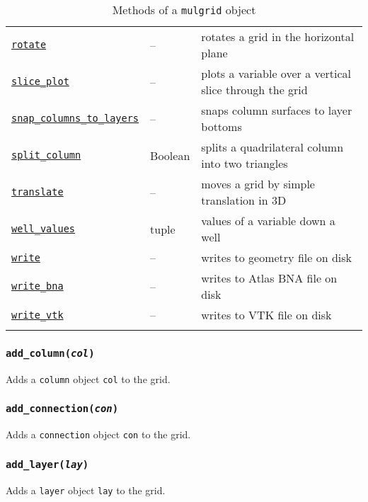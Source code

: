 \begin{center}
\begin{longtable}{|l|l|p{70mm}|}
  \hyperref[sec:rotate]{\texttt{rotate}} & -- & rotates a grid in the horizontal plane\\
  \hyperref[sec:slice_plot]{\texttt{slice\_plot}} & -- & plots a variable over a vertical slice through the grid\\
  \hyperref[sec:snap_columns_to_layers]{\texttt{snap\_columns\_to\_layers}} & -- & snaps column surfaces to layer bottoms\\
  \hyperref[sec:split_column]{\texttt{split\_column}} & Boolean & splits a quadrilateral column into two triangles\\ 
  \hyperref[sec:translate]{\texttt{translate}} & -- & moves a grid by simple translation in 3D\\
  \hyperref[sec:well_values]{\texttt{well\_values}} & tuple & values of a variable down a well\\
  \hyperref[sec:write]{\texttt{write}} & -- & writes to geometry file on disk\\
  \hyperref[sec:write_bna]{\texttt{write\_bna}} & -- & writes to Atlas BNA file on disk\\ 
  \hyperref[sec:write_vtk]{\texttt{write\_vtk}} &  -- & writes to VTK file on disk\\
  \hline
  \caption{Methods of a \texttt{mulgrid} object}
  \label{tb:mulgrid_methods}
\end{longtable}
\end{center}

\subsubsection{\texttt{add\_column(\emph{col})}}
\label{sec:add_column}

Adds a \texttt{column} object \texttt{col} to the grid.

\subsubsection{\texttt{add\_connection(\emph{con})}}
\label{sec:add_connection}

Adds a \texttt{connection} object \texttt{con} to the grid.

\subsubsection{\texttt{add\_layer(\emph{lay})}}
\label{sec:add_layer}

Adds a \texttt{layer} object \texttt{lay} to the grid.

